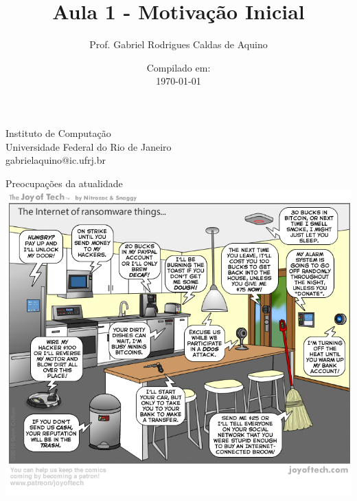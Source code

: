 \title{Aula 1 - Motivação Inicial}

\author{Prof. Gabriel Rodrigues Caldas de Aquino}

\institute
{
    Instituto de Computação \\
    Universidade Federal do Rio de Janeiro\\
    gabrielaquino@ic.ufrj.br %
}
\date{Compilado em: \\ \today} %




\begin{frame}
    \titlepage
\end{frame}

\begin{frame}{Preocupações da atualidade}
\centering
    \includegraphics[width=0.63\linewidth]{Figuras/IoT-ransomware.png}
    

\end{frame}

